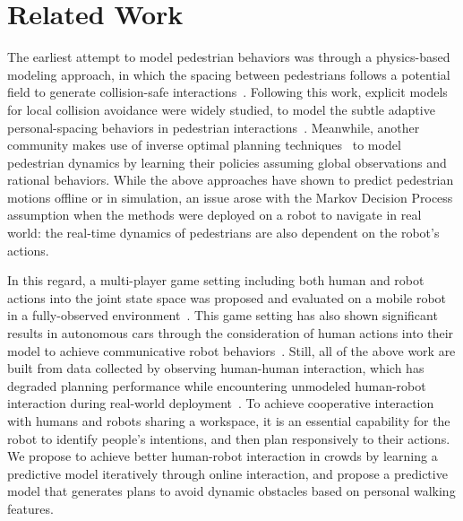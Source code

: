 \documentclass[conference]{IEEEtran}
\begin{document}


\vspace{-0.2em}
\section{Related Work}
\label{sec:related}
\vspace{-0.4em}
The earliest attempt to model pedestrian behaviors was through a physics-based 
modeling approach, in which the spacing between pedestrians follows a 
potential field to generate collision-safe 
interactions~\cite{helbing1995social}. Following this work, explicit models 
for local collision avoidance were widely studied, to model the subtle 
adaptive personal-spacing behaviors in pedestrian 
interactions~\cite{papadakis2014adaptive}. Meanwhile, another community 
makes use of inverse optimal planning 
techniques~\cite{ziebart2009planning,henry2010learning,vasquez2014inverse} to 
model pedestrian dynamics by learning their policies assuming global observations and 
rational behaviors.
While the above approaches have shown to predict pedestrian motions 
offline or in simulation, an issue arose with the Markov Decision 
Process assumption when the methods were deployed on a robot to navigate in real world:
the real-time dynamics of pedestrians are also dependent on the robot's 
actions. 

In this regard, a multi-player game setting including both human and robot actions into the joint state space was proposed and evaluated on a mobile robot in a fully-observed environment~\cite{trautman2010unfreezing}. This game setting has also shown significant results in autonomous cars through the consideration of human actions into their model to achieve communicative robot behaviors~\cite{sadigh2016planning}.
Still, all of the above work are built from data collected by observing human-human 
interaction, which has degraded planning performance while encountering unmodeled 
human-robot interaction during real-world 
deployment~\cite{trautman2015robot, pfeiffer2016predicting}. To achieve 
cooperative interaction with humans and robots sharing a workspace, it is 
an essential capability for the robot to identify people's 
intentions, and then plan responsively to their actions. We propose to achieve 
better human-robot interaction in crowds by learning a predictive model 
iteratively through online interaction, and propose a predictive model 
that generates plans to avoid dynamic obstacles based on personal walking features. 
\vspace{-0.1em}
\end{document}
